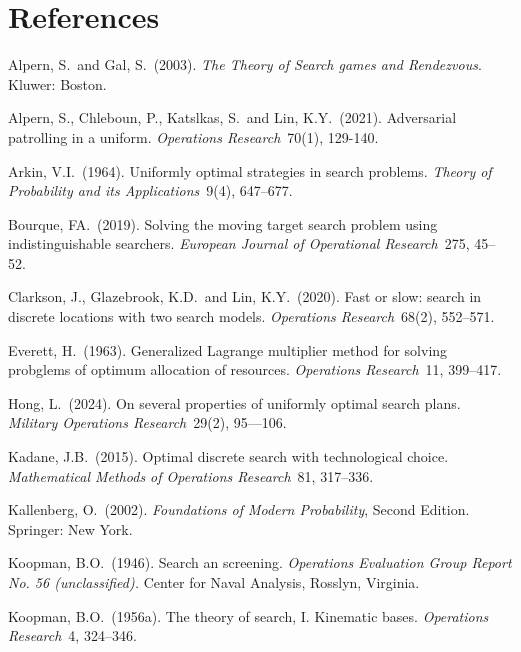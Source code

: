 \documentclass[12pt]{article}
\theoremstyle{plain}
\theoremstyle{definition}
\theoremstyle{remark}
\begin{document}
\section*{References}
\begin{description}

\item{} Alpern, S.~and Gal, S.~(2003). \emph{The Theory of Search games and Rendezvous}.  Kluwer: Boston. 

\item{} Alpern, S., Chleboun, P., Katslkas, S.~and Lin, K.Y.~(2021).  Adversarial patrolling in a uniform. \emph{Operations Research}~70(1), 129-140.

\item{} Arkin, V.I.~(1964). Uniformly optimal strategies in search problems. \emph{Theory of Probability and its Applications}~9(4),  647--677. 

\item{} Bourque, FA.~(2019).  Solving the moving target search problem using indistinguishable searchers. \emph{European Journal of Operational Research}~275, 45--52.

\item{} Clarkson, J., Glazebrook, K.D.~and Lin, K.Y.~(2020). Fast or slow: search in discrete locations with two search models. \emph{Operations Research}~68(2), 552--571.

\item{} Everett, H.~(1963). Generalized Lagrange multiplier method for solving probglems of optimum allocation of resources. \emph{Operations Research}~11, 399--417.

\item{} Hong, L.~(2024).  On several properties of uniformly optimal search plans. \emph{Military Operations Research}~29(2), 95---106. 

\item{} Kadane, J.B.~(2015). Optimal discrete search with technological choice.  \emph{Mathematical Methods of Operations Research}~81, 317--336. 

\item{} Kallenberg, O.~(2002). \emph{Foundations of Modern Probability}, Second Edition.  Springer: New York.

\item{} Koopman, B.O.~(1946). Search an screening. \emph{Operations Evaluation Group Report No. 56 (unclassified).} Center for Naval Analysis, Rosslyn, Virginia. 

\item{} Koopman, B.O.~(1956a). The theory of search, I. Kinematic bases. \emph{Operations Research}~4, 324--346. 



\end{description}
\end{document}
